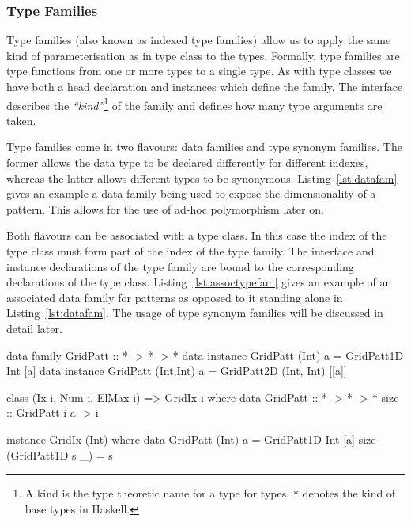 \documentclass[
    12pt,
    a4paper,
    twoside,
    openright,
    ]{scrbook}
\begin{document}
\subsubsection{Type Families}
\label{sec:typefam}

Type families (also known as indexed type families) allow us to apply the same
kind of parameterisation as in type class to the
types\cite{chakravarty05}. Formally, type families are type functions from one
or more types to a single type. As with type classes we have both a head
declaration and instances which define the family. The interface describes the
\emph{``kind''}\footnote{A kind is the type theoretic name for a type for
  types. \texttt{*} denotes the kind of base types in Haskell.} of the family
and defines how many type arguments are taken.

Type families come in two flavours: data families and type synonym families. The
former allows the data type to be declared differently for different indexes,
whereas the latter allows different types to be synonymous.
Listing~\ref{lst:datafam} gives an example a data family being used to expose
the dimensionality of a pattern. This allows for the use of ad-hoc polymorphism
later on.

Both flavours can be associated with a type class. In this case the index of the
type class must form part of the index of the type family. The interface and
instance declarations of the type family are bound to the corresponding
declarations of the type class. Listing~\ref{lst:assoctypefam} gives an example
of an associated data family for patterns as opposed to it standing alone in
Listing~\ref{lst:datafam}. The usage of type synonym families will be discussed
in detail later.

\begin{hflisting}[label=lst:datafam, caption=The data family declares two
  different constructors for 1D and 2D lists. The dimensionality of the list is
  exposed in the type.]

data family GridPatt :: * -> * -> *
data instance GridPatt (Int) a =
    GridPatt1D Int [a]
data instance GridPatt (Int,Int) a =
    GridPatt2D (Int, Int) [[a]]

\end{hflisting}

\begin{hflisting}[label=lst:assoctypefam, caption={The data family from
    listing~\ref{lst:datafam} has now been associated with the class
    \texttt{GridIx} to provide the function \texttt{size} for various
    dimensionalities. Both }]

class (Ix i, Num i, ElMax i) => GridIx i where
    data GridPatt :: * -> * -> *
    size :: GridPatt i a -> i

instance GridIx (Int) where
    data GridPatt (Int) a = GridPatt1D Int [a]
    size (GridPatt1D s _) = s

\end{hflisting}
\end{document}
